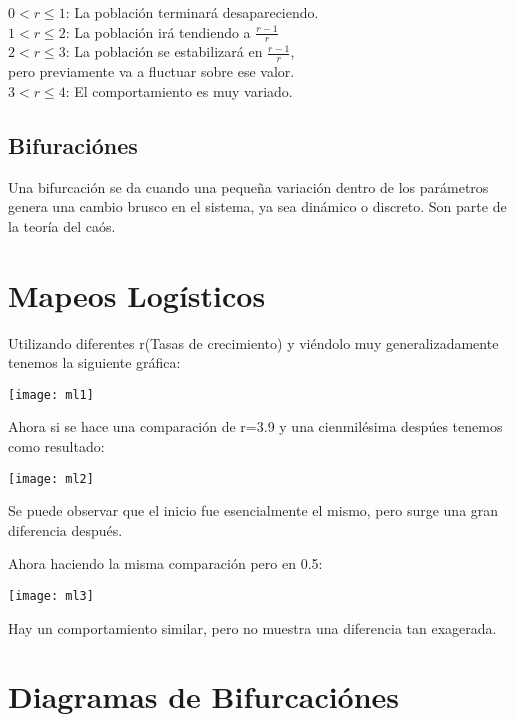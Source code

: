 \documentclass[12pt,a4paper]{article}
\begin{document}
\begin{centering}
$0 < r \leq 1$: La población terminará desapareciendo. \\
$1 < r \leq 2$: La población irá tendiendo a $\frac{r-1}{r}$ \\
$2 < r \leq 3$: La población se estabilizará en $\frac{r-1}{r}$, \\
pero previamente va a fluctuar sobre ese valor. \\
$3 < r \leq 4$: El comportamiento es muy variado. \\
\end{centering}

\subsection{Bifuraciónes}
Una bifurcación se da cuando una pequeña variación dentro de los parámetros genera una cambio brusco en el sistema, ya sea dinámico o discreto. Son parte de la teoría del caós.

\newpage

\section{Mapeos Logísticos}
Utilizando diferentes r(Tasas de crecimiento) y viéndolo muy generalizadamente tenemos la siguiente gráfica:

\begin{center}
\texttt{[image: ml1]}
\end{center}

Ahora si se hace una comparación de r=3.9 y una cienmilésima despúes tenemos como resultado:
\begin{center}
\texttt{[image: ml2]}
\end{center}
Se puede observar que el inicio fue esencialmente el mismo, pero surge una gran diferencia después. \\

\newpage

Ahora haciendo la misma comparación pero en 0.5:
\begin{center}
\texttt{[image: ml3]}
\end{center}
Hay un comportamiento similar, pero no muestra una diferencia tan exagerada.

\section{Diagramas de Bifurcaciónes}
\end{document}
